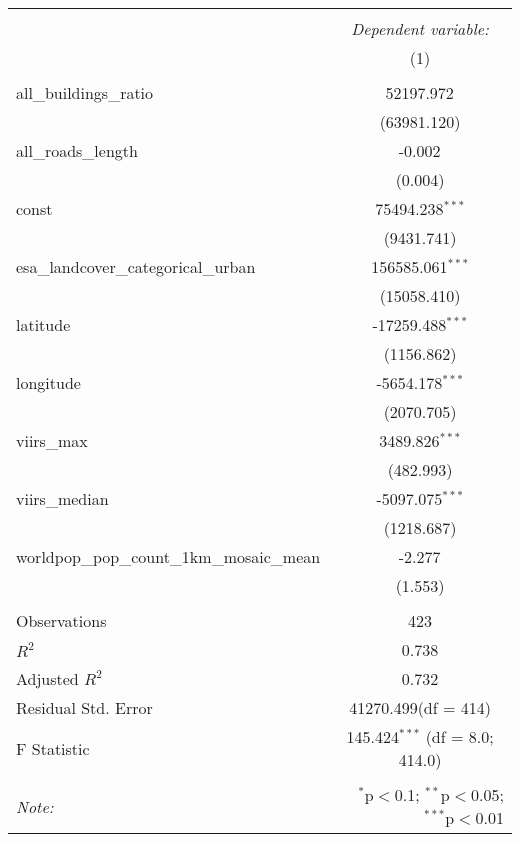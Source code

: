 \begin{table}[!htbp] \centering
\begin{tabular}{@{\extracolsep{5pt}}lc}
\\[-1.8ex]\hline
\hline \\[-1.8ex]
& \multicolumn{1}{c}{\textit{Dependent variable:}} \
\cr \cline{1-2}
\\[-1.8ex] & (1) \\
\hline \\[-1.8ex]
 all_buildings_ratio & 52197.972$^{}$ \\
  & (63981.120) \\
 all_roads_length & -0.002$^{}$ \\
  & (0.004) \\
 const & 75494.238$^{***}$ \\
  & (9431.741) \\
 esa_landcover_categorical_urban & 156585.061$^{***}$ \\
  & (15058.410) \\
 latitude & -17259.488$^{***}$ \\
  & (1156.862) \\
 longitude & -5654.178$^{***}$ \\
  & (2070.705) \\
 viirs_max & 3489.826$^{***}$ \\
  & (482.993) \\
 viirs_median & -5097.075$^{***}$ \\
  & (1218.687) \\
 worldpop_pop_count_1km_mosaic_mean & -2.277$^{}$ \\
  & (1.553) \\
\hline \\[-1.8ex]
 Observations & 423 \\
 $R^2$ & 0.738 \\
 Adjusted $R^2$ & 0.732 \\
 Residual Std. Error & 41270.499(df = 414)  \\
 F Statistic & 145.424$^{***}$ (df = 8.0; 414.0) \\
\hline
\hline \\[-1.8ex]
\textit{Note:} & \multicolumn{1}{r}{$^{*}$p$<$0.1; $^{**}$p$<$0.05; $^{***}$p$<$0.01} \\
\end{tabular}
\end{table}